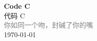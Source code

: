 \vspace*{\fill}
\begin{center}
    \textcolor{pink!50}{\Huge\textbf{Code C}} \\[1em]
    \textcolor{pink!60!pink}{\Large 代码 C} \\[2em]
    \textcolor{gray}{\large 你如同一个吻，封碱了你的嘴} \\[1em]
    \today
\end{center}
\vspace*{\fill}
\clearpage


\clearpage
